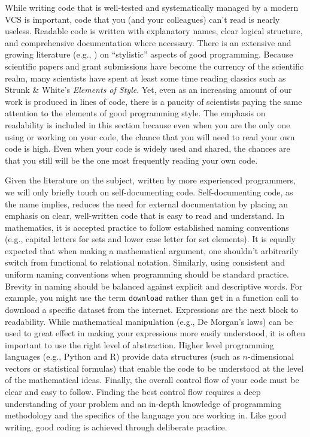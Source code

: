 \documentclass[ChapterTOCs,krantz2]{krantz} %
\theoremstyle{definition}
\begin{document}
While writing code that is well-tested and systematically managed by a modern
VCS is important, code that you (and your colleagues) can't read is
nearly useless. Readable code is written with explanatory names, clear logical
structure, and comprehensive documentation where necessary.  There is an
extensive and growing literature (e.g., \cite{boswell2011art, Fow00,
kernighan1999practice, HT00, mcconnell2009code}) on ``stylistic'' aspects of
good programming. Because scientific papers and grant submissions have become
the currency of the scientific realm, many scientists have spent at least some time reading classics such as Strunk \&
White's \emph{Elements of Style}. Yet, even as an increasing amount of our
work is produced in lines of code, there is a paucity of scientists paying the
same attention to the elements of good programming style. The emphasis on
readability is included in this section because even when you are the only one
using or working on your code, the chance that you will need to read your own
code is high. Even when your code is widely used and shared, the chances are
that you still will be the one most frequently reading your own code.

Given the literature on the subject, written by more experienced programmers,
we will only briefly touch on self-documenting code. Self-documenting code, as
the name implies, reduces the need for external documentation by placing an
emphasis on clear, well-written code that is easy to read and understand.  In
mathematics, it is accepted practice to follow established naming conventions
(e.g., capital letters for sets and lower case letter for set elements). It is
equally expected that when making a mathematical argument, one shouldn't
arbitrarily switch from functional to relational notation.  Similarly, using
consistent and uniform naming conventions when programming should be standard
practice. Brevity in naming should be balanced against explicit and descriptive
words. For example, you might use the term \texttt{download} rather than
\texttt{get} in a function call to download a specific dataset from the
internet. Expressions are the next block to readability. While mathematical
manipulation (e.g., De Morgan's laws) can be used to great effect in making
your expressions more easily understood, it is often important to use the right
level of abstraction. Higher level programming languages (e.g., Python
and R) provide data structures (such as $n$-dimensional vectors or statistical
formulas) that enable the code to be understood at the level of the
mathematical ideas. Finally, the overall control flow of your code must be
clear and easy to follow. Finding the best control flow requires a deep
understanding of your problem and an in-depth knowledge of programming
methodology and the specifics of the language you are working in. Like good
writing, good coding is achieved through deliberate practice.
\end{document}
